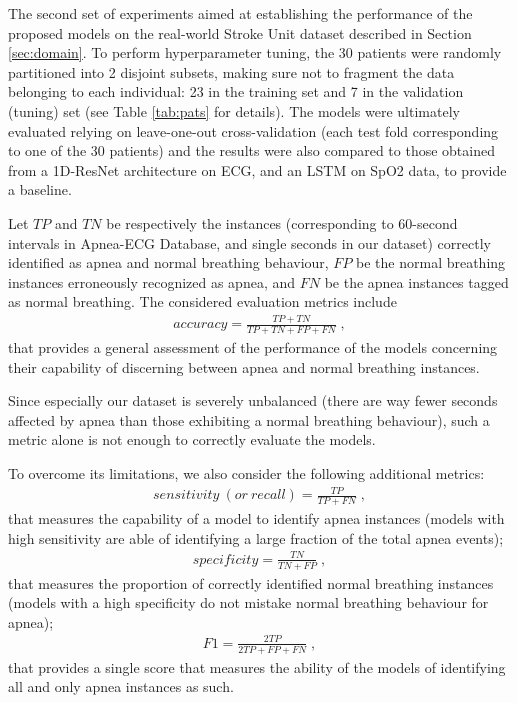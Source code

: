 \documentclass[5p,twocolumn,lefttitle]{elsarticle}
\begin{document}
The second set of experiments aimed at establishing the performance of the proposed models on the real-world Stroke Unit dataset described in Section \ref{sec:domain}. To perform hyperparameter tuning, the 30 patients were randomly partitioned into 2 disjoint subsets, making sure not to fragment the data belonging to each individual: 23 in the training set and 7 in the validation (tuning) set (see Table \ref{tab:pats} for details). The models were ultimately evaluated relying on leave-one-out cross-validation (each test fold corresponding to one of the 30 patients) and the results were also compared to those obtained from a 1D-ResNet architecture \cite{hong2019combining} on ECG, and an LSTM on SpO2 data, to provide a baseline.

Let $TP$ and $TN$ be respectively the instances (corresponding to 60-second intervals in Apnea-ECG Database, and single seconds in our dataset) correctly identified as apnea and normal breathing behaviour, $FP$ be the normal breathing instances erroneously recognized as apnea, and $FN$ be the apnea instances tagged as normal breathing. 
The considered evaluation metrics include
\smallskip
\begin{align}
accuracy = \frac{TP + TN}{TP + TN + FP + FN} \; ,
\end{align}
that provides a general assessment of the performance of the models concerning their capability of discerning between apnea and normal breathing instances. 

Since especially our dataset is severely unbalanced (there are way fewer seconds affected by apnea than those exhibiting a normal breathing behaviour), such a metric alone is not enough to correctly evaluate the models. 

To overcome its limitations, we also consider the following additional metrics:
\begin{align}
    sensitivity \ (or \ recall) = \frac{TP}{TP + FN} \; , 
\end{align}
that measures the capability of a model to identify apnea instances (models with high sensitivity are able of identifying a large fraction of the total apnea events);
\begin{align}
    specificity = \frac{TN}{TN + FP} \; ,
\end{align}
that measures the proportion of correctly identified normal breathing instances (models with a high specificity do not mistake normal breathing behaviour for apnea);
\begin{align}
F1 = \frac{2 TP}{2TP + FP + FN} \; ,
\end{align}
that provides a single score that measures the ability of the models of identifying all and only apnea instances as such.
\end{document}
